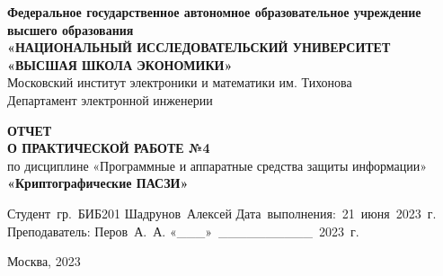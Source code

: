 
\begin{titlepage}
    \begin{center}

        \timesfont
        {\large\bf\timesfont Федеральное‌ ‌государственное‌ ‌автономное‌ ‌образовательное‌ ‌учреждение‌ ‌высшего‌ образования\\}
        {\large\bf\timesfont «НАЦИОНАЛЬНЫЙ‌ ‌ИССЛЕДОВАТЕЛЬСКИЙ‌ ‌УНИВЕРСИТЕТ‌ «ВЫСШАЯ‌ ‌ШКОЛА‌ ‌ЭКОНОМИКИ»‌\\}
        Московский‌ ‌институт‌ ‌электроники‌ ‌и‌ ‌математики‌ ‌им. Тихонова‌\\
        Департамент‌ ‌электронной‌ ‌инженерии‌\\

        \vfill
        \vfill

        {\bf\timesfont ОТЧЕТ \\
            О ПРАКТИЧЕСКОЙ РАБОТЕ №4} \\
        по дисциплине «Программные и аппаратные средства защиты информации» \\
        {\bf\timesfont «Криптографические ПАСЗИ»} \\


        \vfill
        \vfill
        \vfill

        \hfill\vbox
        {
            \hbox{Студент гр. БИБ201}
            \hbox{Шадрунов Алексей}
            \hbox{Дата выполнения: 21 июня 2023 г.}
            \hbox{}
            \hbox{Преподаватель:}
            \hbox{Перов А. А.}
            \hbox{«\_\_\_» \_\_\_\_\_\_\_\_\_\_ 2023 г.}
        }

        \vfill

        Москва, 2023
    \end{center}
\end{titlepage}

